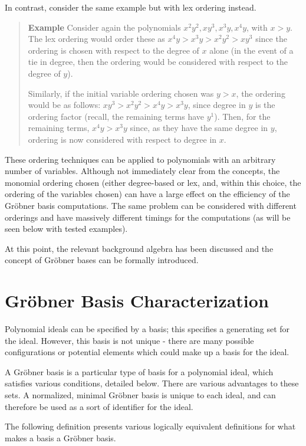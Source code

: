\documentclass[letterpaper,12pt,titlepage,oneside,final]{book}
\newenvironment{example}{\begin{quote}%
  \textbf{Example }%
  \quad
}{%
\end{quote}%
}
\begin{document}
In contrast, consider the same example but with lex ordering instead.
\begin{example}\label{ex: Multivariate lex ordering}
  Consider again the polynomials ${x^2y^2, xy^3, x^3y, x^4y}$, with ${x > y}$.  The lex ordering would order these as ${x^4y > x^3y > x^2y^2 > xy^3}$ since the ordering is chosen with respect to the degree of ${x}$ alone (in the event of a tie in degree, then the ordering would be considered with respect to the degree of ${y}$).

  Similarly, if the initial variable ordering chosen was ${y > x}$, the ordering would be as follows:
  ${xy^3 > x^2y^2 > x^4y > x^3y}$, since degree in ${y}$ is the ordering factor (recall, the remaining terms have ${y^1}$).  Then, for the remaining terms, ${x^4y > x^3y}$ since, as they have the same degree in ${y}$, ordering is now considered with respect to degree in ${x}$.
\end{example}

These ordering techniques can be applied to polynomials with an arbitrary number of variables.  Although not immediately clear from the concepts, the monomial ordering chosen (either degree-based or lex, and, within this choice, the ordering of the variables chosen) can have a large effect on the efficiency of the Gr\"obner basis computations.  The same problem can be considered with different orderings and have massively different timings for the computations (as will be seen below with tested examples).

At this point, the relevant background algebra has been discussed and the concept of Gr\"obner bases can be formally introduced.


\section{Gr\"obner Basis Characterization}

Polynomial ideals can be specified by a basis; this specifies a generating set for the ideal.  However, this basis is not unique - there are many possible configurations or potential elements which could make up a basis for the ideal.  

A Gr\"obner basis is a particular type of basis for a polynomial ideal, which satisfies various conditions, detailed below.  There are various advantages to these sets.  A normalized, minimal Gr\"obner basis is unique to each ideal, and can therefore be used as a sort of identifier for the ideal. 

The following definition presents various logically equivalent definitions for what makes a basis a Gr\"obner basis. 
\end{document}
